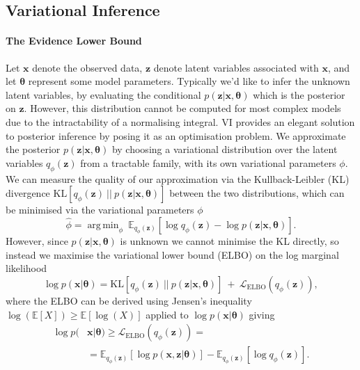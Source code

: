 \documentclass[letterpaper]{article} \usepackage{aaai20}  \usepackage{times}  \usepackage{helvet} \usepackage{courier}  \usepackage[hyphens]{url}  \usepackage{graphicx} \urlstyle{rm} \def\UrlFont{\rm}  \usepackage{graphicx}  \frenchspacing  \setlength{\pdfpagewidth}{8.5in}  \setlength{\pdfpageheight}{11in}  \nocopyright
\DeclareMathOperator*{\argmin}{arg\,min}
\begin{document}
\subsection{Variational Inference}\label{subsec: Variational Inference}
\paragraph{The Evidence Lower Bound} Let $\mathbf{x}$ denote the observed data, $\mathbf{z}$ denote latent variables associated with $\mathbf{x}$, and let $\boldsymbol{\theta}$ represent some model parameters. Typically we'd like to infer the unknown latent variables, by evaluating the conditional $p(\mathbf{z}|\mathbf{x},\boldsymbol{\theta})$ which is the posterior on $\mathbf{z}$. However, this distribution cannot be computed for most complex models due to the intractability of a normalising integral. VI provides an elegant solution to posterior inference by posing it as an optimisation problem. We approximate the posterior $p(\mathbf{z}|\mathbf{x},\boldsymbol{\theta})$ by choosing a variational distribution over the latent variables $q_{\phi}(\mathbf{z})$ from a tractable family, with its own variational parameters $\phi$. We can measure the quality of our approximation via the Kullback-Leibler (KL) divergence $\mathrm{KL}[q_{\phi}(\mathbf{z}) \ || \ p(\mathbf{z}|\mathbf{x},\boldsymbol{\theta})]$ between the two distributions, which can be minimised via the variational parameters $\phi$
\begin{equation}
    \widehat{\phi} = \argmin_{\phi} \ \mathbb{E}_{q_{\phi}(\mathbf{z})} [\log q_{\phi}(\mathbf{z}) - \log p(\mathbf{z}|\mathbf{x},\boldsymbol{\theta})].
\end{equation}
However, since $p(\mathbf{z}|\mathbf{x},\boldsymbol{\theta})$ is unknown we cannot minimise the KL directly, so instead we maximise the variational lower bound (ELBO) on the log marginal likelihood 
\begin{equation}
    \log p(\mathbf{x}|\boldsymbol{\theta}) = \text{KL}[q_{\phi}(\mathbf{z}) \ || \ p(\mathbf{z}|\mathbf{x},\boldsymbol{\theta})] \ + \ \mathcal{L}_{\text{ELBO}}(q_{\phi}(\mathbf{z})),
\end{equation}
where the ELBO can be derived using Jensen's inequality $\log(\mathbb{E}[X]) \geq \mathbb{E}[\log(X)]$ applied to $\log p(\mathbf{x}|\boldsymbol{\theta})$ giving 
\begin{equation}
\begin{aligned}
    \log p(&\mathbf{x}|\boldsymbol{\theta})\geq \mathcal{L}_{\text{ELBO}}(q_{\phi}(\mathbf{z})) = \\ &= \mathbb{E}_{q_{\phi}(\mathbf{z})} [\log p(\mathbf{x},\mathbf{z}|\boldsymbol{\theta})] - \mathbb{E}_{q_{\phi}(\mathbf{z})} [\log q_{\phi}(\mathbf{z})].  
\end{aligned}
\end{equation}
\end{document}
